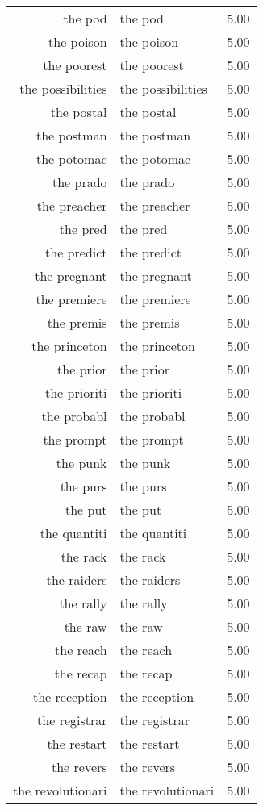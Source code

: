 \begin{table}[ht]
\begin{tabular}{rlr}
  the pod & the pod & 5.00 \\ 
  the poison & the poison & 5.00 \\ 
  the poorest & the poorest & 5.00 \\ 
  the possibilities & the possibilities & 5.00 \\ 
  the postal & the postal & 5.00 \\ 
  the postman & the postman & 5.00 \\ 
  the potomac & the potomac & 5.00 \\ 
  the prado & the prado & 5.00 \\ 
  the preacher & the preacher & 5.00 \\ 
  the pred & the pred & 5.00 \\ 
  the predict & the predict & 5.00 \\ 
  the pregnant & the pregnant & 5.00 \\ 
  the premiere & the premiere & 5.00 \\ 
  the premis & the premis & 5.00 \\ 
  the princeton & the princeton & 5.00 \\ 
  the prior & the prior & 5.00 \\ 
  the prioriti & the prioriti & 5.00 \\ 
  the probabl & the probabl & 5.00 \\ 
  the prompt & the prompt & 5.00 \\ 
  the punk & the punk & 5.00 \\ 
  the purs & the purs & 5.00 \\ 
  the put & the put & 5.00 \\ 
  the quantiti & the quantiti & 5.00 \\ 
  the rack & the rack & 5.00 \\ 
  the raiders & the raiders & 5.00 \\ 
  the rally & the rally & 5.00 \\ 
  the raw & the raw & 5.00 \\ 
  the reach & the reach & 5.00 \\ 
  the recap & the recap & 5.00 \\ 
  the reception & the reception & 5.00 \\ 
  the registrar & the registrar & 5.00 \\ 
  the restart & the restart & 5.00 \\ 
  the revers & the revers & 5.00 \\ 
  the revolutionari & the revolutionari & 5.00 \\ 

\end{tabular}
\end{table}
